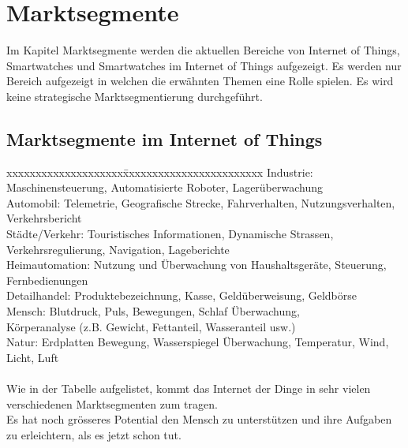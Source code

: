 \chapter{Marktsegmente}
Im Kapitel Marktsegmente werden die aktuellen Bereiche von Internet of Things, Smartwatches und Smartwatches im Internet of Things aufgezeigt. Es werden nur Bereich aufgezeigt in welchen die erwähnten Themen eine Rolle spielen. Es wird keine strategische Marktsegmentierung durchgeführt.

\section{Marktsegmente im Internet of Things}
\begin{tabbing}
xxxxxxxxxxxxxxxxxxxx\=xxxxxxxxxxxxxxxxxxxxxxxx	\kill
Industrie:  		 \>  Maschinensteuerung, Automatisierte Roboter, Lagerüberwachung \\
Automobil: 		   \>  Telemetrie, Geografische Strecke, Fahrverhalten, Nutzungsverhalten, Verkehrsbericht \\
Städte{/}Verkehr:\>  Touristisches Informationen, Dynamische Strassen, Verkehrsregulierung, Navigation, Lageberichte \\
Heimautomation:	 \>  Nutzung und Überwachung von Haushaltsgeräte, Steuerung, Fernbedienungen \\
Detailhandel:		 \>  Produktebezeichnung, Kasse, Geldüberweisung, Geldbörse \\
Mensch:          \>  Blutdruck, Puls, Bewegungen, Schlaf Überwachung, \\\>Körperanalyse {(z.B. Gewicht, Fettanteil, Wasseranteil usw.)} \\
Natur:			     \>  Erdplatten Bewegung, Wasserspiegel Überwachung, Temperatur, Wind, Licht, Luft \\\\

Wie in der Tabelle aufgelistet, kommt das Internet der Dinge in sehr vielen verschiedenen Marktsegmenten zum tragen.\\
Es hat noch grösseres Potential den Mensch zu unterstützen und ihre Aufgaben zu erleichtern, als es jetzt schon tut.
\end{tabbing}

